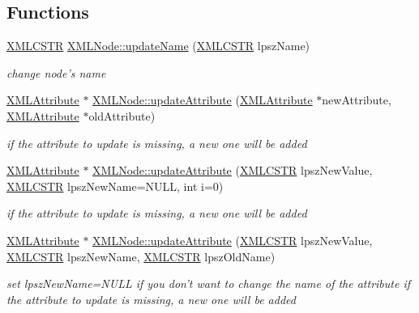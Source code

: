 \subsection*{Functions}
\begin{DoxyCompactItemize}
\item 
\hyperlink{xmlParser_8h_acdb0d6fd8dd596384b438d86cfb2b182}{X\-M\-L\-C\-S\-T\-R} \hyperlink{group__xmlUpdate_gae08b643a2b87a77bad3c70eb57ea3043}{X\-M\-L\-Node\-::update\-Name} (\hyperlink{xmlParser_8h_acdb0d6fd8dd596384b438d86cfb2b182}{X\-M\-L\-C\-S\-T\-R} lpsz\-Name)
\begin{DoxyCompactList}\small\item\em change node's name \end{DoxyCompactList}\item 
\hyperlink{structXMLAttribute}{X\-M\-L\-Attribute} $\ast$ \hyperlink{group__xmlUpdate_ga49449139e44ef214d0c861e0b84f3757}{X\-M\-L\-Node\-::update\-Attribute} (\hyperlink{structXMLAttribute}{X\-M\-L\-Attribute} $\ast$new\-Attribute, \hyperlink{structXMLAttribute}{X\-M\-L\-Attribute} $\ast$old\-Attribute)
\begin{DoxyCompactList}\small\item\em if the attribute to update is missing, a new one will be added \end{DoxyCompactList}\item 
\hyperlink{structXMLAttribute}{X\-M\-L\-Attribute} $\ast$ \hyperlink{group__xmlUpdate_ga43e30a2630824996f5eb74ffcfa54adf}{X\-M\-L\-Node\-::update\-Attribute} (\hyperlink{xmlParser_8h_acdb0d6fd8dd596384b438d86cfb2b182}{X\-M\-L\-C\-S\-T\-R} lpsz\-New\-Value, \hyperlink{xmlParser_8h_acdb0d6fd8dd596384b438d86cfb2b182}{X\-M\-L\-C\-S\-T\-R} lpsz\-New\-Name=N\-U\-L\-L, int i=0)
\begin{DoxyCompactList}\small\item\em if the attribute to update is missing, a new one will be added \end{DoxyCompactList}\item 
\hyperlink{structXMLAttribute}{X\-M\-L\-Attribute} $\ast$ \hyperlink{group__xmlUpdate_gad334b0726cb7075a16aaca98aaff6372}{X\-M\-L\-Node\-::update\-Attribute} (\hyperlink{xmlParser_8h_acdb0d6fd8dd596384b438d86cfb2b182}{X\-M\-L\-C\-S\-T\-R} lpsz\-New\-Value, \hyperlink{xmlParser_8h_acdb0d6fd8dd596384b438d86cfb2b182}{X\-M\-L\-C\-S\-T\-R} lpsz\-New\-Name, \hyperlink{xmlParser_8h_acdb0d6fd8dd596384b438d86cfb2b182}{X\-M\-L\-C\-S\-T\-R} lpsz\-Old\-Name)
\begin{DoxyCompactList}\small\item\em set lpsz\-New\-Name=N\-U\-L\-L if you don't want to change the name of the attribute if the attribute to update is missing, a new one will be added \end{DoxyCompactList}\item 

\end{DoxyCompactItemize}
